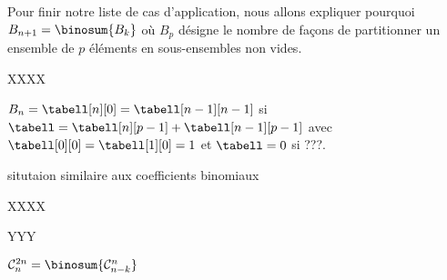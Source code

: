 Pour finir notre liste de cas d'application, nous allons expliquer pourquoi $B_{n+1} = \binosum{B_k}$ où $B_p$ désigne le nombre de façons de partitionner un ensemble de $p$ éléments en sous-ensembles non vides.

XXXX

$B_n = \tabell[n][0] = \tabell[n-1][n-1]$
si
$\tabell = \tabell[n][p-1] + \tabell[n-1][p-1]$
avec
$\tabell[0][0] = \tabell[1][0] = 1$
et
$\tabell = 0$
si ???.

situtaion similaire aux coefficients binomiaux 


XXXX


\explaintree{\tabell}{\tabell[n][p-1]}{\tabell[n-1][p-1]}%
            {\bellintertree}{}


YYY




$\mathcal{C}^{2n}_n = \binosum{\mathcal{C}^n_{n-k}}$